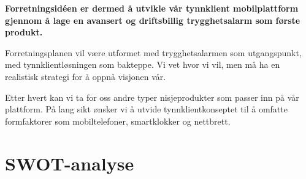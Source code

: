 \textbf{Forretningsidéen er dermed å utvikle vår tynnklient mobilplattform
gjennom å lage en avansert og driftsbillig trygghetsalarm som første produkt.}

Forretningsplanen vil være utformet med trygghetsalarmen som utgangspunkt, med
tynnklientløsningen som bakteppe. Vi vet hvor vi vil, men må ha en realistisk
strategi for å oppnå visjonen vår.

Etter hvert kan vi ta for oss andre typer nisjeprodukter som passer inn på vår
plattform.  På lang sikt ønsker vi å utvide tynnklientkonseptet til å omfatte
formfaktorer som mobiltelefoner, smartklokker og nettbrett. 

\section{SWOT-analyse}


